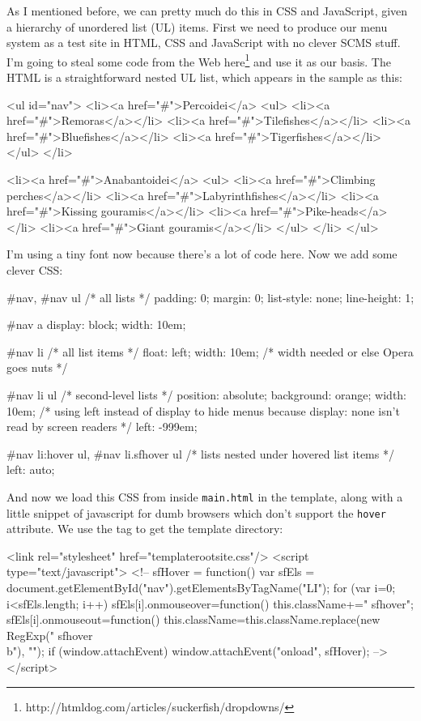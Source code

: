 As I mentioned before, we can pretty much do this in CSS and JavaScript, given a hierarchy of
unordered list (UL) items. First we need to produce our menu system as a test
site in HTML, CSS and JavaScript with no clever SCMS stuff. I'm going to steal
some code from the Web
here\footnote{http://htmldog.com/articles/suckerfish/dropdowns/} and use it as
our basis. The HTML is a straightforward nested UL list, which appears in the
sample as this:
\begin{MyVerbatim2}
<ul id="nav">
	<li><a href="#">Percoidei</a>
		<ul>
			<li><a href="#">Remoras</a></li>
			<li><a href="#">Tilefishes</a></li>
			<li><a href="#">Bluefishes</a></li>
			<li><a href="#">Tigerfishes</a></li>
		</ul>
	</li>

	<li><a href="#">Anabantoidei</a>
		<ul>
			<li><a href="#">Climbing perches</a></li>
			<li><a href="#">Labyrinthfishes</a></li>
			<li><a href="#">Kissing gouramis</a></li>
			<li><a href="#">Pike-heads</a></li>
			<li><a href="#">Giant gouramis</a></li>
		</ul>
	</li>
</ul>
\end{MyVerbatim2}
I'm using a tiny font now because there's a lot of code here. Now we add some
clever CSS:
\begin{MyVerbatim2}
#nav, #nav ul { /* all lists */
	padding: 0;
	margin: 0;
	list-style: none;
	line-height: 1;
}

#nav a {
	display: block;
	width: 10em;
}

#nav li { /* all list items */
	float: left;
	width: 10em; /* width needed or else Opera goes nuts */
}

#nav li ul { /* second-level lists */
	position: absolute;
	background: orange;
	width: 10em;
	/* using left instead of display to hide menus because
	display: none isn't read by screen readers */
	left: -999em; 
}

#nav li:hover ul, #nav li.sfhover ul { /* lists nested under hovered list items */
	left: auto;
}
\end{MyVerbatim2}
And now we load this CSS from inside \texttt{main.html} in the template, along
with a little snippet of javascript for dumb browsers which don't support the
\texttt{hover} attribute. We use the  tag to get the template
directory:
\begin{MyVerbatim2}
<link rel="stylesheet" href="{{templateroot}}site.css"/>
<script type="text/javascript">
<!--
sfHover = function() {
	var sfEls = document.getElementById("nav").getElementsByTagName("LI");
	for (var i=0; i<sfEls.length; i++) {
		sfEls[i].onmouseover=function() {
			this.className+=" sfhover";
		}
		sfEls[i].onmouseout=function() {
			this.className=this.className.replace(new RegExp(" sfhover\\b"), "");
		}
	}
}
if (window.attachEvent) window.attachEvent("onload", sfHover);
-->
</script>
\end{MyVerbatim2}
